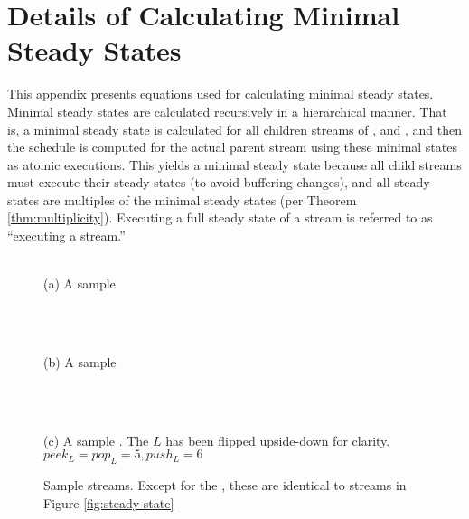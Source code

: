 \section{Details of Calculating Minimal Steady States}
\label{apx:eqs}

This appendix presents equations used for calculating minimal
steady states.  Minimal steady states are calculated recursively
in a hierarchical manner. That is, a minimal steady state is
calculated for all children streams of {\pipeline}, {\splitjoin}
and {\feedbackloop}, and then the schedule is computed for the
actual parent stream using these minimal states as atomic
executions. This yields a minimal steady state because all child
streams must execute their steady states (to avoid buffering
changes), and all steady states are multiples of the minimal
steady states (per Theorem \ref{thm:multiplicity}).  Executing a
full steady state of a stream is referred to as ``executing a
stream.''

\begin{figure}
\begin{center}

\begin{minipage}{1.5in}
\centering {} \\
{\protect\small (a) A sample {\pipeline}}
\end{minipage}
~
\begin{minipage}{1.5in}
\centering {} \\
{\protect\small (b) A sample {\splitjoin}}
\end{minipage}
~
\begin{minipage}{2in}
\centering {} \\
{\protect\small (c) A sample {\feedbackloop}.  The $L$ {\filter}
has been flipped upside-down for clarity.\\$peek_L = pop_L = 5,
push_L = 6$}
\end{minipage}

\caption{Sample {\StreamIt} streams. Except for the \pipeline,
these are identical to streams in Figure \ref{fig:steady-state}}
\label{fig:app:steady-state}

\end{center}
\end{figure}

\subsection{\filter}

